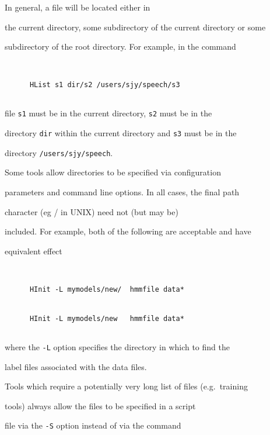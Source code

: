 In general, a file will be located either in


the current directory, some subdirectory of the current directory or some


subdirectory of the root directory.  For example, in the command


\begin{verbatim}


      HList s1 dir/s2 /users/sjy/speech/s3


\end{verbatim}


file \texttt{s1} must be in the current directory, \texttt{s2} must be in the


directory \texttt{dir} within the current directory and \texttt{s3} must be in the


directory \texttt{/users/sjy/speech}.





Some tools allow directories to be specified via configuration


parameters and command line options.  In all cases, the final path


character (eg / in UNIX) need not (but may be)


included.  For example, both of the following are acceptable and have


equivalent effect


\begin{verbatim}


      HInit -L mymodels/new/  hmmfile data*


      HInit -L mymodels/new   hmmfile data*


\end{verbatim}  


where the \texttt{-L} option specifies the directory in which to find the 


label files associated with the data files. 










Tools which require a potentially very long list of files (e.g.\ training


tools) always allow the files to be specified in a script


file via the \texttt{-S} option instead of via the command


